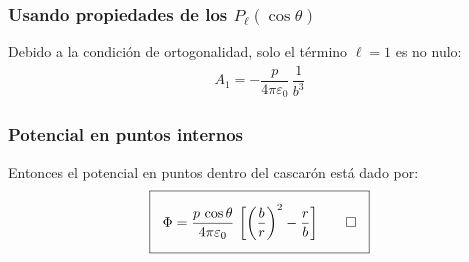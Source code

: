 \documentclass[12pt]{beamer}
\begin{document}
\begin{frame}
\frametitle{Usando propiedades de los $P_{\ell} (\cos \theta)$}
Debido a la condición de ortogonalidad, solo el término $\ell = 1$ es no nulo:
\pause
\begin{align*}
A_{1} = - \dfrac{p}{4 \pi \varepsilon_{0}} \, \dfrac{1}{b^{3}}
\end{align*}
\end{frame}
\begin{frame}
\frametitle{Potencial en puntos internos}
Entonces el potencial en puntos dentro del cascarón está dado por:
\pause
\begin{align*}
\setlength{\fboxsep}{3\fboxsep}\boxed{
\Phi = \dfrac{p \, \cos \theta}{4 \pi \varepsilon_{0}} ~ \bigg[ \bigg( \dfrac{b}{r} \bigg)^{2} - \dfrac{r}{b} \bigg] \qed}
\end{align*}
\end{frame}
\end{document}
